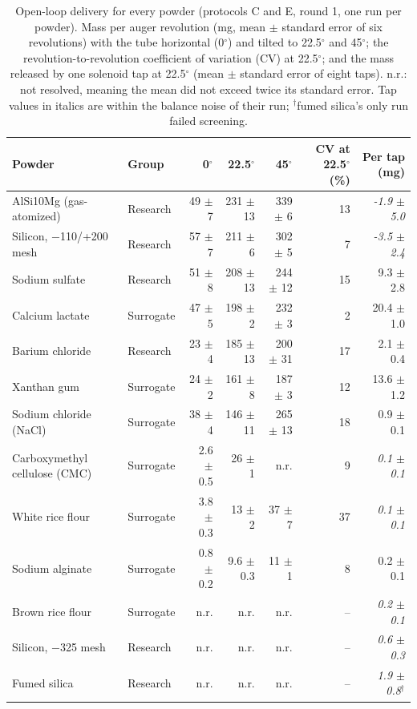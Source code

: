 \documentclass[10pt]{article}
\begin{document}
\begin{table}[htbp]
\small
  \caption{Open-loop delivery for every powder (protocols C and E, round 1, one
  run per powder). Mass per auger revolution (mg, mean $\pm$ standard error of six
  revolutions) with the tube horizontal (0$^\circ$) and tilted to 22.5$^\circ$ and
  45$^\circ$; the revolution-to-revolution coefficient of variation (CV) at
  22.5$^\circ$; and the mass released by one solenoid tap at 22.5$^\circ$ (mean
  $\pm$ standard error of eight taps). n.r.: not resolved, meaning the mean did not
  exceed twice its standard error. Tap values in italics are within the balance
  noise of their run; $^\dagger$fumed silica's only run failed screening.}
  \label{tbl:v2openloop}
  \begin{tabular*}{\textwidth}{@{\extracolsep{\fill}}llrrrrr}
    \hline
    Powder & Group & 0$^\circ$ & 22.5$^\circ$ & 45$^\circ$ & CV at 22.5$^\circ$ (\%) & Per tap (mg) \\
    \hline
    AlSi10Mg (gas-atomized) & Research & 49 $\pm$ 7 & 231 $\pm$ 13 & 339 $\pm$ 6 & 13 & \textit{-1.9 $\pm$ 5.0} \\
    Silicon, $-$110/+200 mesh & Research & 57 $\pm$ 7 & 211 $\pm$ 6 & 302 $\pm$ 5 & 7 & \textit{-3.5 $\pm$ 2.4} \\
    Sodium sulfate & Research & 51 $\pm$ 8 & 208 $\pm$ 13 & 244 $\pm$ 12 & 15 & 9.3 $\pm$ 2.8 \\
    Calcium lactate & Surrogate & 47 $\pm$ 5 & 198 $\pm$ 2 & 232 $\pm$ 3 & 2 & 20.4 $\pm$ 1.0 \\
    Barium chloride & Research & 23 $\pm$ 4 & 185 $\pm$ 13 & 200 $\pm$ 31 & 17 & 2.1 $\pm$ 0.4 \\
    Xanthan gum & Surrogate & 24 $\pm$ 2 & 161 $\pm$ 8 & 187 $\pm$ 3 & 12 & 13.6 $\pm$ 1.2 \\
    Sodium chloride (NaCl) & Surrogate & 38 $\pm$ 4 & 146 $\pm$ 11 & 265 $\pm$ 13 & 18 & 0.9 $\pm$ 0.1 \\
    Carboxymethyl cellulose (CMC) & Surrogate & 2.6 $\pm$ 0.5 & 26 $\pm$ 1 & n.r. & 9 & \textit{0.1 $\pm$ 0.1} \\
    White rice flour & Surrogate & 3.8 $\pm$ 0.3 & 13 $\pm$ 2 & 37 $\pm$ 7 & 37 & \textit{0.1 $\pm$ 0.1} \\
    Sodium alginate & Surrogate & 0.8 $\pm$ 0.2 & 9.6 $\pm$ 0.3 & 11 $\pm$ 1 & 8 & 0.2 $\pm$ 0.1 \\
    Brown rice flour & Surrogate & n.r. & n.r. & n.r. & -- & \textit{0.2 $\pm$ 0.1} \\
    Silicon, $-$325 mesh & Research & n.r. & n.r. & n.r. & -- & \textit{0.6 $\pm$ 0.3} \\
    Fumed silica & Research & n.r. & n.r. & n.r. & -- & \textit{1.9 $\pm$ 0.8}$^\dagger$ \\
    \hline
  \end{tabular*}
\end{table}
\end{document}
